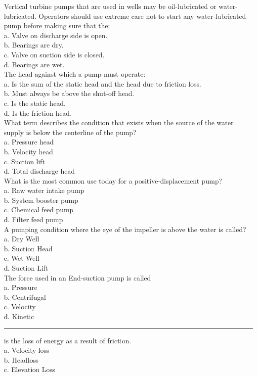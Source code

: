Vertical turbine pumps that are used in wells may be oil-lubricated or water-lubricated. Operators should use extreme care not to start any water-lubricated pump before making sure that the:\\
a.	Valve on discharge side is open.\\
b. Bearings are dry.\\
c.	Valve on suction side is closed.\\
d.	Bearings are wet.\\
The head against which a pump must operate:\\
a.	Is the sum of the static head and the head due to friction loss.\\
b.	Must always be above the  shut-off  head.\\
c.	Is the static head.\\
d.	Is the friction head.\\
What term describes the condition that exists when the source of the water supply is below the  centerline of the  pump?\\
a.	Pressure  head\\
b.	Velocity head\\
c.	Suction lift\\
d.	Total discharge head\\
What is the most common use today for a positive-displacement pump?\\
a.	Raw water intake pump\\
b.	System booster pump\\
c.	Chemical feed pump\\
d.	Filter feed pump\\
A pumping condition where the eye of the impeller is above the water is called?\\
a.	Dry Well\\
b.	Suction Head\\
c.	Wet Well\\
d.	Suction Lift\\
The force used in an End-suction pump is called\\
a.	Pressure\\
b.	Centrifugal\\
c.	Velocity\\
d.	Kinetic\\
\rule{9mm}{0.5pt} is the loss of energy as a result of friction.\\
a.	Velocity loss\\
b.	Headloss\\
c.	Elevation Loss\\
